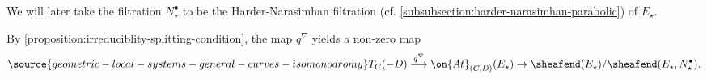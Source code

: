 We will later take the filtration $N_\star^\bullet$ to be the Harder-Narasimhan
filtration (cf. \autoref{subsubsection:harder-narasimhan-parabolic}) of $E_\star$.
%

%


By \autoref{proposition:irreduciblity-splitting-condition},
the map $q^\nabla$ yields a non-zero map
\begin{align}\label{q-nabla-map}
\source{geometric-local-systems-general-curves-isomonodromy}
	T_C(-D)\overset{q^\nabla}\longrightarrow
\on{At}_{(C,D)}(E_\star) \to
\sheafend(E_\star)/\sheafend(E_\star, N_\star^\bullet).
\end{align}

